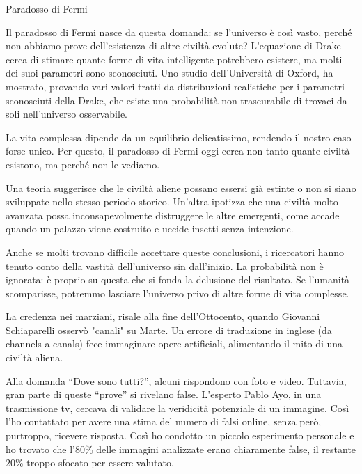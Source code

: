 \documentclass[12pt]{book} %
\begin{document}
\begin{mdframed}[linewidth=1pt]
Paradosso di Fermi

Il paradosso di Fermi nasce da questa domanda: se l’universo è così vasto, perché non abbiamo prove dell’esistenza di altre civiltà evolute? L’equazione di Drake cerca di stimare quante forme di vita intelligente potrebbero esistere, ma molti dei suoi parametri sono sconosciuti. Uno studio dell’Università di Oxford, ha mostrato, provando vari valori tratti da distribuzioni realistiche per i parametri sconosciuti della Drake, che esiste una probabilità non trascurabile di trovaci da soli nell’universo osservabile.

La vita complessa dipende da un equilibrio delicatissimo, rendendo il nostro caso forse unico. Per questo, il paradosso di Fermi oggi cerca non tanto quante civiltà esistono, ma perché non le vediamo.

Una teoria suggerisce che le civiltà aliene possano essersi già estinte o non si siano sviluppate nello stesso periodo storico. Un’altra ipotizza che una civiltà molto avanzata possa inconsapevolmente distruggere le altre emergenti, come accade quando un palazzo viene costruito e uccide insetti senza intenzione.

Anche se molti trovano difficile accettare queste conclusioni, i ricercatori hanno tenuto conto della vastità dell’universo sin dall’inizio. La probabilità non è ignorata: è proprio su questa che si fonda la delusione del risultato. Se l’umanità scomparisse, potremmo lasciare l’universo privo di altre forme di vita complesse.

La credenza nei marziani, risale alla fine dell’Ottocento, quando Giovanni Schiaparelli osservò "canali" su Marte. Un errore di traduzione in inglese (da channels a canals) fece immaginare opere artificiali, alimentando il mito di una civiltà aliena.

Alla domanda “Dove sono tutti?”, alcuni rispondono con foto e video. Tuttavia, gran parte di queste “prove” si rivelano false. L’esperto Pablo Ayo, in una trasmissione tv, cercava di validare la veridicità potenziale di un immagine. Così l'ho contattato per avere una stima del numero di falsi online, senza però, purtroppo, ricevere risposta. Così ho condotto un piccolo esperimento personale e ho trovato che l’80\% delle immagini analizzate erano chiaramente false, il restante 20\% troppo sfocato per essere valutato.


\end{mdframed}
\end{document}
